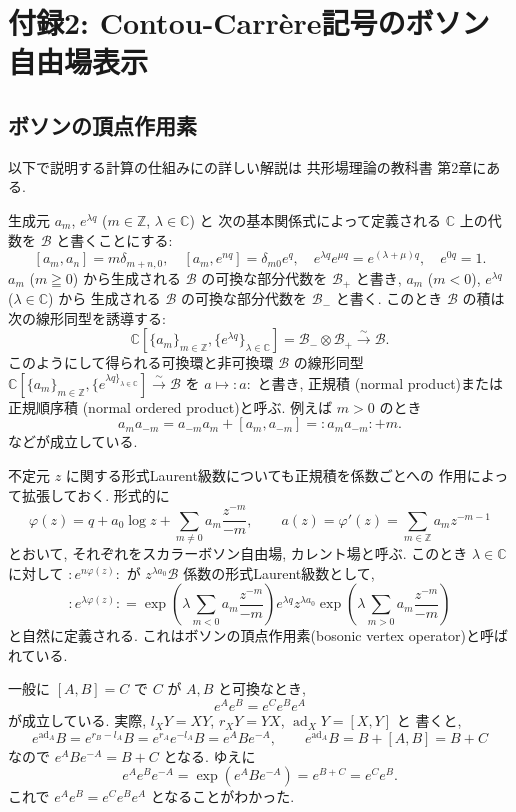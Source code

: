 \documentclass[12pt,twoside]{jarticle}
\newcommand\Z{{\mathbb Z}} %
\newcommand\C{{\mathbb C}} %
\theoremstyle{definition} %
\theoremstyle{definition} %
\theoremstyle{definition} %
\numberwithin{theorem}{section}
\numberwithin{equation}{section}
\numberwithin{figure}{section}
\numberwithin{table}{section}
\newcommand\B{{\mathcal B}}
\newcommand\isomto{\overset{\sim}{\to}}
\newcommand\np[1]{{:}{#1}{:}}
\newcommand\ad{\operatorname{\mathrm{ad}}}
\begin{document}
\section{付録2: Contou-Carr\`ere記号のボソン自由場表示}
\label{sec:CC-Heis}


\subsection{ボソンの頂点作用素}

以下で説明する計算の仕組みにの詳しい解説は
共形場理論の教科書 \cite{yamada} 第2章にある.

生成元 $a_m$, $e^{\lambda q}$ ($m\in\Z$, $\lambda\in\C$) と
次の基本関係式によって定義される $\C$ 上の代数を $\B$ と書くことにする:
\[
[a_m,a_n]=m\delta_{m+n,0}, \quad
[a_m,e^{nq}]=\delta_{m0}e^q, \quad
e^{\lambda q}e^{\mu q}=e^{(\lambda+\mu)q}, \quad
e^{0q}=1.
\]
$a_m$ ($m\geqq0$) から生成される $\B$ の可換な部分代数を $\B_+$ と書き, 
$a_m$ ($m<0$), $e^{\lambda q}$ ($\lambda\in\C$) から
生成される $\B$ の可換な部分代数を $\B_-$ と書く.
このとき $\B$ の積は次の線形同型を誘導する:
\[
 \C[\{a_m\}_{m\in\Z}, \{e^{\lambda q}\}_{\lambda\in\C}]=
\B_-\otimes\B_+ \isomto \B.
\]
このようにして得られる可換環と非可換環 $\B$ の線形同型 
$\C[\{a_m\}_{m\in\Z}, \{e^{\lambda q\}_{\lambda\in\C}}]\isomto\B$
を $a\mapsto \np{a}$ と書き, 正規積 (normal product)または
正規順序積 (normal ordered product)と呼ぶ. 例えば $m>0$ のとき
\[
 a_m a_{-m} = a_{-m}a_m + [a_m,a_{-m}]= \np{a_m a_{-m}} + m.
\]
などが成立している.

不定元 $z$ に関する形式Laurent級数についても正規積を係数ごとへの
作用によって拡張しておく. 形式的に
\[
\varphi(z) = q + a_0\log z + \sum_{m\ne 0}a_m\frac{z^{-m}}{-m},  \qquad
a(z)=\varphi'(z)=\sum_{m\in\Z} a_m z^{-m-1}
\]
とおいて, それぞれをスカラーボソン自由場, カレント場と呼ぶ.
このとき $\lambda\in\C$ に対して $\np{e^{n\varphi(z)}}$ 
が $z^{\lambda a_0}\B$ 係数の形式Laurent級数として,
\[
\np{e^{\lambda\varphi(z)}}=
\exp\left(\lambda\sum_{m<0}a_m\frac{z^{-m}}{-m}\right)
e^{\lambda q}
z^{\lambda a_0}
\exp\left(\lambda\sum_{m>0}a_m\frac{z^{-m}}{-m}\right)
\]
と自然に定義される. 
これはボソンの頂点作用素(bosonic vertex operator)と呼ばれている.

一般に $[A,B]=C$ で $C$ が $A,B$ と可換なとき, 
\[
e^A e^B = e^C e^B e^A
\]
が成立している. 実際, $l_X Y=XY$, $r_X Y=YX$, $\ad_X Y=[X,Y]$ と
書くと, 
\[
e^{\ad_A} B = e^{r_B-l_A} B = e^{r_A}e^{-l_A} B = e^A B e^{-A}, \qquad
e^{\ad_A} B = B + [A,B] = B+C
\]
なので $e^A B e^{-A}=B+C$ となる. ゆえに
\[
e^A e^B e^{-A} = \exp(e^A B e^{-A}) = e^{B+C}=e^C e^B.
\]
これで $e^A e^B = e^C e^B e^A$ となることがわかった.
\end{document}
